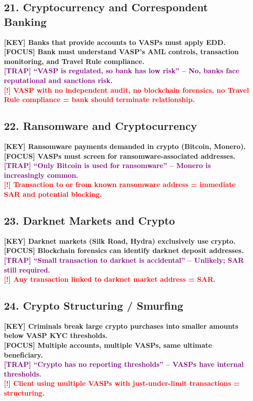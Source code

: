 \documentclass[10pt,a4paper]{article}
\newcommand{\redflag}[1]{\textcolor{red}{\textbf{[!] #1}}}
\newcommand{\examfocus}[1]{\textcolor{orange!80!black}{\textbf{[FOCUS] #1}}}
\newcommand{\trap}[1]{\textcolor{purple}{\textbf{[TRAP] #1}}}
\newcommand{\keyterm}[1]{\textcolor{red!80!black}{\textbf{[KEY] #1}}}
\begin{document}
\subsection*{21. Cryptocurrency and Correspondent Banking}
\keyterm{Banks that provide accounts to VASPs must apply EDD.} \\
\examfocus{Bank must understand VASP's AML controls, transaction monitoring, and Travel Rule compliance.} \\
\trap{“VASP is regulated, so bank has low risk” – No, banks face reputational and sanctions risk.} \\
\redflag{VASP with no independent audit, no blockchain forensics, no Travel Rule compliance = bank should terminate relationship.}

\subsection*{22. Ransomware and Cryptocurrency}
\keyterm{Ransomware payments demanded in crypto (Bitcoin, Monero).} \\
\examfocus{VASPs must screen for ransomware-associated addresses.} \\
\trap{“Only Bitcoin is used for ransomware” – Monero is increasingly common.} \\
\redflag{Transaction to or from known ransomware address = immediate SAR and potential blocking.}

\subsection*{23. Darknet Markets and Crypto}
\keyterm{Darknet markets (Silk Road, Hydra) exclusively use crypto.} \\
\examfocus{Blockchain forensics can identify darknet deposit addresses.} \\
\trap{“Small transaction to darknet is accidental” – Unlikely; SAR still required.} \\
\redflag{Any transaction linked to darknet market address = SAR.}

\subsection*{24. Crypto Structuring / Smurfing}
\keyterm{Criminals break large crypto purchases into smaller amounts below VASP KYC thresholds.} \\
\examfocus{Multiple accounts, multiple VASPs, same ultimate beneficiary.} \\
\trap{“Crypto has no reporting thresholds” – VASPs have internal thresholds.} \\
\redflag{Client using multiple VASPs with just-under-limit transactions = structuring.}
\end{document}

